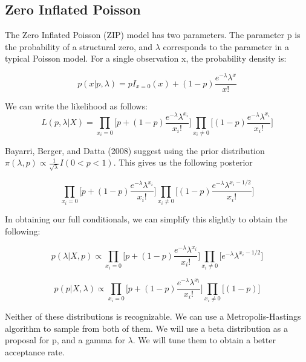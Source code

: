 \documentclass{article}
\begin{document}
\subsection{Zero Inflated Poisson}
\label{ss:mZiPoisson}

The Zero Inflated Poisson (ZIP) model has two parameters. The parameter p is the probability of a structural zero, and $\lambda$ corresponds to the parameter in a typical Poisson model. For a single observation x, the probability density is:

\[
p(x|p, \lambda) = pI_{x=0}(x) + (1-p)\frac{e^{-\lambda}\lambda^x}{x!}
\]
 
 
\noindent We can write the likelihood as follows:
$$
L(p, \lambda|X) = \prod_{x_i=0}\bigg[p+(1-p)\frac{e^{-\lambda}\lambda^{x_i}}{x_i!}\bigg]\prod_{x_i \ne 0}\bigg[(1-p)\frac{e^{-\lambda}\lambda^{x_i}}{x_i!}\bigg]
$$

\noindent Bayarri, Berger, and Datta (2008) suggest using the prior distribution $\pi(\lambda, p) \propto \frac{1}{\sqrt{\lambda}}I(0<p<1)$. This gives us the following posterior 

\[
\prod_{x_i=0}\bigg[p+(1-p)\frac{e^{-\lambda}\lambda^{x_i}}{x_i!}\bigg]\prod_{x_i \ne 0}\bigg[(1-p)\frac{e^{-\lambda}\lambda^{x_i - 1/2}}{x_i!}\bigg]
\]

\noindent In obtaining our full conditionals, we can simplify this slightly to obtain the following:

\[
p(\lambda|X, p) \propto \prod_{x_i=0}\bigg[p+(1-p)\frac{e^{-\lambda}\lambda^{x_i}}{x_i!}\bigg]\prod_{x_i \ne 0}\bigg[e^{-\lambda}\lambda^{x_i - 1/2}\bigg]
\]

\[
p(p|X, \lambda) \propto \prod_{x_i=0}\bigg[p+(1-p)\frac{e^{-\lambda}\lambda^{x_i}}{x_i!}\bigg]\prod_{x_i \ne 0}\bigg[(1-p)\bigg]
\]

\noindent Neither of these distributions is recognizable. We can use a Metropolis-Hastings algorithm to sample from both of them. We will use a beta distribution as a proposal for p, and a gamma for $\lambda$. We will tune them to obtain a better acceptance rate. 
\end{document}
